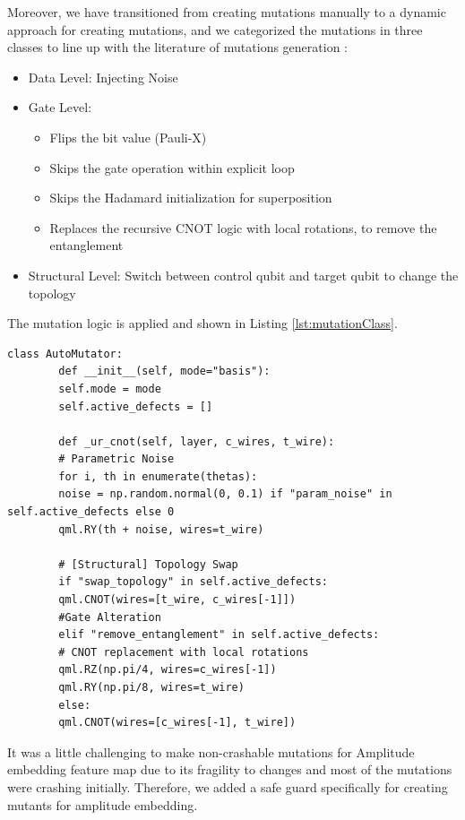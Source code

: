 \documentclass[12pt,a4paper]{article}
\begin{document}
	Moreover, we have transitioned from creating mutations manually to a dynamic approach for creating mutations, and we categorized the mutations in three classes to line up with the literature of mutations generation \cite{9844849, qMutphyFortunato}:
	\begin{itemize}
		\item Data Level: Injecting Noise
		\item Gate Level: 
		\begin{itemize}
			\item Flips the bit value (Pauli-X)
			\item Skips the gate operation within explicit loop
			\item Skips the Hadamard initialization for superposition
			\item Replaces the recursive CNOT logic with local rotations, to remove the entanglement
		\end{itemize}
		\item Structural Level: Switch between control qubit and target qubit to change the topology
	\end{itemize}
	
	The mutation logic is applied and shown in Listing \ref{lst:mutationClass}.
	
	
	
	\begin{lstlisting}[caption=Dynamic Mutator Sample, label={lst:mutationClass}]
		class AutoMutator:
		def __init__(self, mode="basis"):
		self.mode = mode
		self.active_defects = [] 
		
		def _ur_cnot(self, layer, c_wires, t_wire):
		# Parametric Noise
		for i, th in enumerate(thetas):
		noise = np.random.normal(0, 0.1) if "param_noise" in self.active_defects else 0
		qml.RY(th + noise, wires=t_wire)
		
		# [Structural] Topology Swap
		if "swap_topology" in self.active_defects:
		qml.CNOT(wires=[t_wire, c_wires[-1]])
		#Gate Alteration
		elif "remove_entanglement" in self.active_defects:
		# CNOT replacement with local rotations
		qml.RZ(np.pi/4, wires=c_wires[-1]) 
		qml.RY(np.pi/8, wires=t_wire)
		else:
		qml.CNOT(wires=[c_wires[-1], t_wire])
	\end{lstlisting}
	
	It was a little challenging to make non-crashable mutations for Amplitude embedding feature map due to its fragility to changes and most of the mutations were crashing initially. Therefore, we added a safe guard specifically for creating mutants for amplitude embedding. 
	
\end{document}
